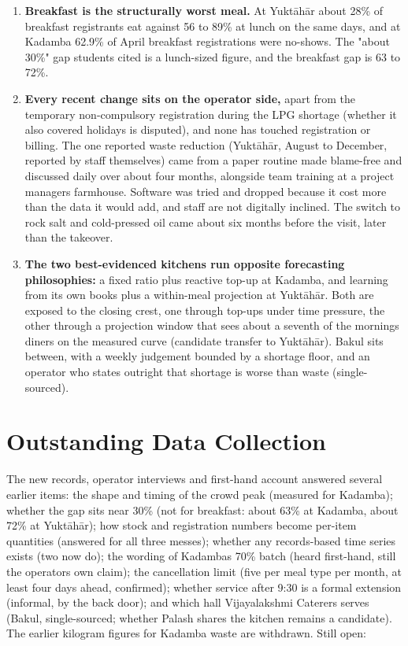 \documentclass[
  10pt,
  table]{article}
\newcounter{none} %
\begin{document}
\begin{enumerate}
\item
  \textbf{Breakfast is the structurally worst meal.} At Yuktāhār about 28\% of breakfast registrants eat against 56 to 89\% at lunch on the same days, and at Kadamba 62.9\% of April breakfast registrations were no-shows. The "about 30\%" gap students cited is a lunch-sized figure, and the breakfast gap is 63 to 72\%.
\item
  \textbf{Every recent change sits on the operator side,} apart from the temporary non-compulsory registration during the LPG shortage (whether it also covered holidays is disputed), and none has touched registration or billing. The one reported waste reduction (Yuktāhār, August to December, reported by staff themselves) came from a paper routine made blame-free and discussed daily over about four months, alongside team training at a project manager\textquotesingle s farmhouse. Software was tried and dropped because it cost more than the data it would add, and staff are not digitally inclined. The switch to rock salt and cold-pressed oil came about six months before the visit, later than the takeover.
\item
  \textbf{The two best-evidenced kitchens run opposite forecasting philosophies:} a fixed ratio plus reactive top-up at Kadamba, and learning from its own books plus a within-meal projection at Yuktāhār. Both are exposed to the closing crest, one through top-ups under time pressure, the other through a projection window that sees about a seventh of the morning\textquotesingle s diners on the measured curve (candidate transfer to Yuktāhār). Bakul sits between, with a weekly judgement bounded by a shortage floor, and an operator who states outright that shortage is worse than waste (single-sourced).
\end{enumerate}

\section{Outstanding Data Collection}\label{outstanding-data-collection}

The new records, operator interviews and first-hand account answered several earlier items: the shape and timing of the crowd peak (measured for Kadamba); whether the gap sits near 30\% (not for breakfast: about 63\% at Kadamba, about 72\% at Yuktāhār); how stock and registration numbers become per-item quantities (answered for all three messes); whether any records-based time series exists (two now do); the wording of Kadamba\textquotesingle s 70\% batch (heard first-hand, still the operator\textquotesingle s own claim); the cancellation limit (five per meal type per month, at least four days ahead, confirmed); whether service after 9:30 is a formal extension (informal, by the back door); and which hall Vijayalakshmi Caterers serves (Bakul, single-sourced; whether Palash shares the kitchen remains a candidate). The earlier kilogram figures for Kadamba waste are withdrawn. Still open:
\end{document}
